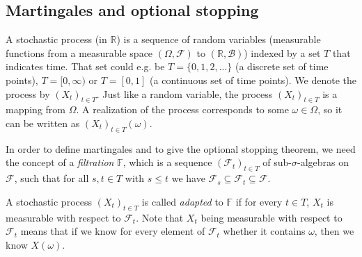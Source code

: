 \documentclass[11pt]{article}
\theoremstyle{plain}
\theoremstyle{definition}
\newcommand{\reals}{\mathbb{R}}
\begin{document}


















\subsection{Martingales and  optional stopping} \label{appmart}
A stochastic process (in $\reals$) is a sequence of random variables (measurable functions from a measurable space $(\Omega, \mathcal{F})$ to $(\reals, \mathcal{B})$) indexed by a set $T$ that indicates time. That set could e.g. be $T=\{0,1,2,...\}$ (a discrete set of time points), $T=[0,\infty)$ or $T=[0,1]$ (a continuous set of time points). We denote the process by $(X_t)_{t\in T}$. Just like a random variable, the process $(X_t)_{t\in T}$ is a mapping from $\Omega$. A realization of the process corresponds to some $\omega\in \Omega$, so it can be written as $(X_t)_{t\in T}(\omega)$.

In order to define martingales and to give the optional stopping theorem, we need the concept of a \emph{filtration} $\mathbb{F}$, which is a sequence $(\mathcal{F}_t)_{t\in T}$ of sub-$\sigma$-algebras on $\mathcal{F}$, such that for all $s,t\in T$ with $s\leq t$ we have $\mathcal{F}_s\subseteq \mathcal{F}_t\subseteq \mathcal{F}$.

A stochastic process $(X_t)_{t\in T}$ is called \emph{adapted} to $\mathbb{F}$ if for every $t\in T$, $X_t$ is measurable with respect to $\mathcal{F}_t$. Note that 
$X_t$ being measurable with respect to $\mathcal{F}_t$ means that   if we know for every element of $\mathcal{F}_t$ whether it contains $\omega$, then we know $X(\omega)$. 


\end{document}
